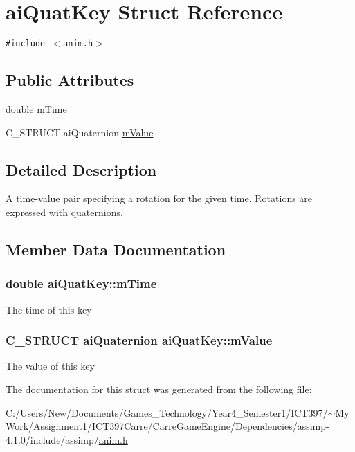 \hypertarget{structai_quat_key}{
\section{aiQuatKey Struct Reference}
\label{structai_quat_key}
}
{\tt \#include $<$anim.h$>$}

\subsection*{Public Attributes}
\begin{CompactItemize}
\item 
double \hyperlink{structai_quat_key_fb56b697e491c918bdeb1b32d03bbcf8}{mTime}
\item 
C\_\-STRUCT aiQuaternion \hyperlink{structai_quat_key_08bf706065137951fd89c5914bb5a2aa}{mValue}
\end{CompactItemize}


\subsection{Detailed Description}
A time-value pair specifying a rotation for the given time. Rotations are expressed with quaternions. 

\subsection{Member Data Documentation}
\hypertarget{structai_quat_key_fb56b697e491c918bdeb1b32d03bbcf8}{
\subsubsection[mTime]{\setlength{\rightskip}{0pt plus 5cm}double {\bf aiQuatKey::mTime}}}
\label{structai_quat_key_fb56b697e491c918bdeb1b32d03bbcf8}


The time of this key \hypertarget{structai_quat_key_08bf706065137951fd89c5914bb5a2aa}{
\subsubsection[mValue]{\setlength{\rightskip}{0pt plus 5cm}C\_\-STRUCT aiQuaternion {\bf aiQuatKey::mValue}}}
\label{structai_quat_key_08bf706065137951fd89c5914bb5a2aa}


The value of this key 

The documentation for this struct was generated from the following file:\begin{CompactItemize}
\item 
C:/Users/New/Documents/Games\_\-Technology/Year4\_\-Semester1/ICT397/$\sim$My Work/Assignment1/ICT397Carre/CarreGameEngine/Dependencies/assimp-4.1.0/include/assimp/\hyperlink{anim_8h}{anim.h}\end{CompactItemize}
